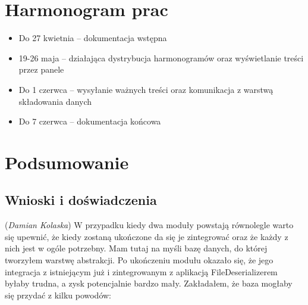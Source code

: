 \documentclass[12pt, a4paper]{article}
\providecommand{\tightlist}{%
  \setlength{\itemsep}{0pt}\setlength{\parskip}{0pt}}
\begin{document}
\hypertarget{harmonogram-prac}{%
\section{Harmonogram prac}\label{harmonogram-prac}}

\begin{itemize}
\tightlist
\item
  Do 27 kwietnia -- dokumentacja wstępna
\item
  19-26 maja -- działająca dystrybucja harmonogramów oraz wyświetlanie
  treści przez panele
\item
  Do 1 czerwca -- wysyłanie ważnych treści oraz komunikacja z warstwą
  składowania danych
\item
  Do 7 czerwca -- dokumentacja końcowa
\end{itemize}

\hypertarget{podsumowanie}{%
\section{Podsumowanie}\label{podsumowanie}}

\hypertarget{wnioski}{%
\subsection{Wnioski i doświadczenia}\label{wnioski}}

(\textit{Damian Kolaska}) W przypadku kiedy dwa moduły powstają równolegle warto się upewnić, że kiedy zostaną ukończone da się je zintegrować oraz że każdy z nich jest w ogóle potrzebny. Mam tutaj na myśli bazę danych, do której tworzyłem warstwę abstrakcji. Po ukończeniu modułu okazało się, że jego integracja z istniejącym już i zintegrowanym z aplikacją FileDeserializerem byłaby trudna, a zysk potencjalnie bardzo mały. Zakładałem, że baza mogłaby się przydać z kilku powodów:
\end{document}
